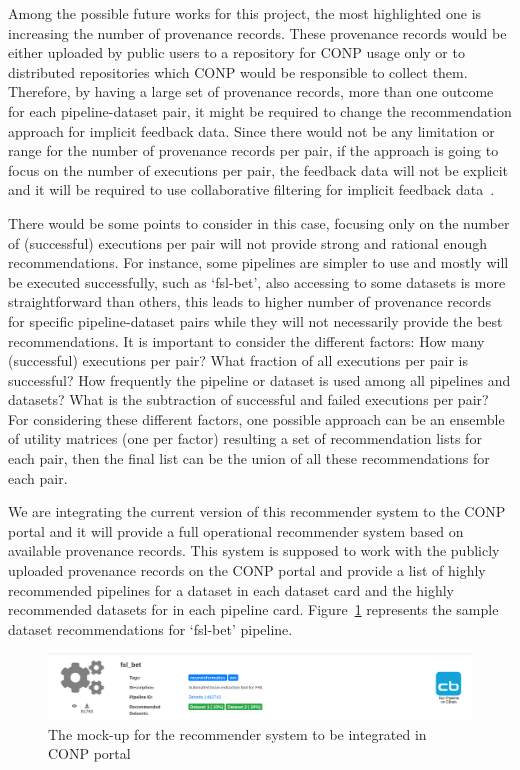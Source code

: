 Among the possible future works for this project, the most highlighted one is increasing the number of provenance records. These provenance records would be either uploaded by public users to a repository for CONP usage only or to distributed repositories which CONP would be responsible to collect them. Therefore, by having a large set of provenance records, more than one outcome for each pipeline-dataset pair, it might be required to change the recommendation approach for implicit feedback data. 
Since there would not be any limitation or range for the number of provenance records per pair, if the approach is going to focus on the number of executions per pair, the feedback data will not be explicit and it will be required to use collaborative filtering for implicit feedback data~\cite{hu2008collaborative}.

There would be some points to consider in this case, focusing only on the number of (successful) executions per pair will not provide strong and rational enough recommendations. For instance, some pipelines are simpler to use and mostly will be executed successfully, such as `fsl-bet', also accessing to some datasets is more straightforward than others, this leads to higher number of provenance records for specific pipeline-dataset pairs while they will not necessarily provide the best recommendations. It is important to consider the different factors: How many (successful) executions per pair? What fraction of all executions per pair is successful? How frequently the pipeline or dataset is used among all pipelines and datasets? What is the subtraction of successful and failed executions per pair? For considering these different factors, one possible approach can be an ensemble of utility matrices (one per factor) resulting a set of recommendation lists for each pair, then the final list can be the union of all these recommendations for each pair.

We are integrating the current version of this recommender system to the CONP portal and it will provide a full operational recommender system based on available provenance records. This system is supposed to work with the publicly uploaded provenance records on the CONP portal and provide a list of highly recommended pipelines for a dataset in each dataset card and the highly recommended datasets for in each pipeline card. Figure~\ref{fig:mockup} represents the sample dataset recommendations for `fsl-bet' pipeline.

\begin{figure}
    \centering
    \includegraphics[width=\textwidth]{figures/mockup.png}
    \caption{The mock-up for the recommender system to be integrated in CONP portal}
    \label{fig:mockup}
\end{figure}